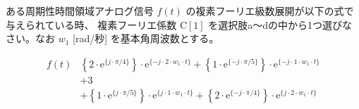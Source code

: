 ある周期性時間領域アナログ信号 $f(t)$ の複素フーリエ級数展開が以下の式で与えられている時、
複素フーリエ係数 $\textrm{C}[1]$ を選択肢a〜dの中から1つ選びなさい。なお $w_1$ [rad/秒] を基本角周波数とする。

\begin{align*}
f(t) 
&  \left \{ 2 \cdot \textrm{e}^{\{ j \cdot \pi/4 \}} \right \} \cdot \textrm{e}^{\{-j \cdot    2 \cdot w_1 \cdot t \}}
 + \left \{ 1 \cdot \textrm{e}^{\{-j \cdot \pi/5 \}} \right \} \cdot \textrm{e}^{\{-j \cdot    1 \cdot w_1 \cdot t \}} \\
&+ 3 \\
&+ \left \{ 1 \cdot \textrm{e}^{\{ j \cdot \pi/5 \}} \right \} \cdot \textrm{e}^{\{ j \cdot    1 \cdot w_1 \cdot t \}} 
 + \left \{ 2 \cdot \textrm{e}^{\{-j \cdot \pi/4 \}} \right \} \cdot \textrm{e}^{\{ j \cdot    2 \cdot w_1 \cdot t \}} 
\end{align*}
